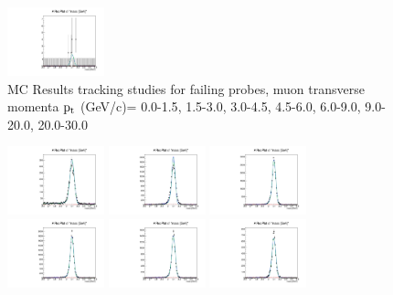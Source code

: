\documentclass{article}
\begin{document}
\begin{figure}
    \includegraphics[width=0.25\textwidth]{../PlotsRooFitMC/croofit_trk_fail_6.pdf}
    \caption{MC Results tracking studies for failing probes, muon transverse momenta
    $\rm p_{t}$ (GeV/c)= {0.0-1.5}, {1.5-3.0}, {3.0-4.5}, {4.5-6.0}, 
    {6.0-9.0}, {9.0-20.0}, {20.0-30.0}}
\end{figure}

\begin{figure}
    \includegraphics[width=0.25\textwidth]{../PlotsRooFitMC/croofit_id_pass_0.pdf}
    \includegraphics[width=0.25\textwidth]{../PlotsRooFitMC/croofit_id_pass_1.pdf}
    \includegraphics[width=0.25\textwidth]{../PlotsRooFitMC/croofit_id_pass_2.pdf}
    \includegraphics[width=0.25\textwidth]{../PlotsRooFitMC/croofit_id_pass_3.pdf}
    \includegraphics[width=0.25\textwidth]{../PlotsRooFitMC/croofit_id_pass_4.pdf}
    \includegraphics[width=0.25\textwidth]{../PlotsRooFitMC/croofit_id_pass_5.pdf}

\end{figure}
\end{document}
